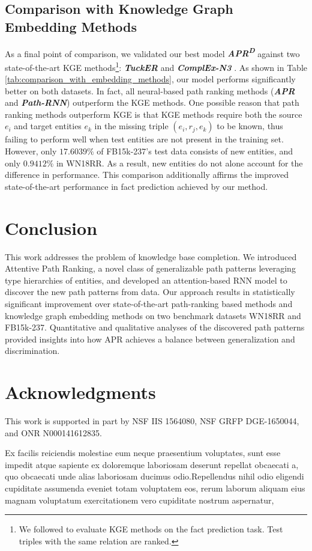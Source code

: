 \documentclass[letterpaper]{article} %
\begin{document}
\subsection{Comparison with Knowledge Graph Embedding Methods}
As a final point of comparison, we validated our best model \textit{\textbf{APR\textsuperscript{D}}} against two state-of-the-art KGE methods\footnote{We followed \cite{deeppath} to evaluate KGE methods on the fact prediction task. Test triples with the same relation are ranked.}: \textit{\textbf{TuckER}} \cite{tucker} and \textbf{\textit{ComplEx-N3}} \cite{complex}. As shown in Table \ref{tab:comparison_with_embedding_methods}, our model performs significantly better on both datasets. In fact, all neural-based path ranking methods (\textit{\textbf{APR}} and \textbf{\textit{Path-RNN}}) outperform the KGE methods. One possible reason that path ranking methods outperform KGE is that KGE methods require both the source $e_i$ and target entities $e_k$ in the missing triple $(e_i, r_j, e_k)$ to be known, thus failing to perform well when test entities are not present in the training set.  However, only $17.6039\%$ of FB15k-237's test data consists of new entities, and only $0.9412\%$ in WN18RR.  As a result, new entities do not alone account for the difference in performance.  This comparison additionally affirms the improved state-of-the-art performance in fact prediction achieved by our method.











\section{Conclusion}
This work addresses the problem of knowledge base completion.  We introduced Attentive Path Ranking, a novel class of generalizable path patterns leveraging type hierarchies of entities, and developed an attention-based RNN model to discover the new path patterns from data. Our approach results in statistically significant improvement over state-of-the-art path-ranking based methods and knowledge graph embedding methods on two benchmark datasets WN18RR and FB15k-237. Quantitative and qualitative analyses of the discovered path patterns provided insights into how APR achieves a balance between generalization and discrimination.

\section{ Acknowledgments}
This work is supported in part by NSF IIS 1564080, NSF GRFP DGE-1650044, and ONR N000141612835.


Ex facilis reiciendis molestiae eum neque praesentium voluptates, sunt esse impedit atque sapiente ex doloremque laboriosam deserunt repellat obcaecati a, quo obcaecati unde alias laboriosam ducimus odio.Repellendus nihil odio eligendi cupiditate assumenda eveniet totam voluptatem eos, rerum laborum aliquam eius magnam voluptatum exercitationem vero cupiditate nostrum aspernatur,

\end{document}
